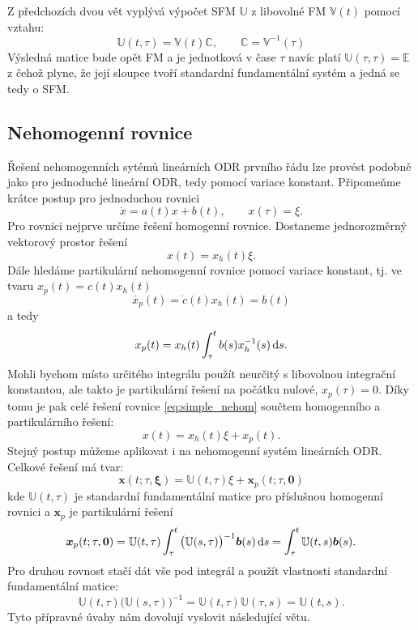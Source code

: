 \documentclass[a4paper, 12pt]{book}
\theoremstyle{definition}
\def\d{\,{\rm d}}               %
\def\vc#1{\mathbf{\boldsymbol{#1}}}     %
\def\tn#1{{\mathbb{#1}}}    %
\begin{document}
Z předchozích dvou vět vyplývá výpočet SFM  $\tn U$ z libovolné FM $\tn V(t)$ pomocí vztahu:
\[
    \tn U(t, \tau) = \tn V(t) \tn C,\qquad \tn C = \tn V^{-1}(\tau)
\]
Výsledná matice bude opět FM a je jednotková v čase $\tau$ navíc platí $\tn U(\tau,\tau) = \tn E$ z čehož plyne, 
že její sloupce tvoří standardní fundamentální systém a jedná se tedy o SFM.


\subsection{Nehomogenní rovnice}
Řešení nehomogenních sytémů lineárních ODR prvního řádu lze provést podobně jako pro jednoduché 
lineární ODR, tedy pomocí variace konstant. Připomeňme krátce postup pro jednoduchou rovnici
\[
  \dot{x} = a(t)x + b(t), \qquad x(\tau) = \xi.
\]
Pro rovnici nejprve určíme řešení homogenní rovnice. Dostaneme jednorozměrný vektorový prostor řešení
\[
   x(t) = x_h(t) \xi. 
\]
Dále hledáme partikulární nehomogenní rovnice pomocí variace konstant, tj. ve tvaru $x_p(t) = c(t) x_h(t)$
\[
   \dot{ x_p }(t) = \dot{c}(t) x_h(t) = b(t)
\]
a tedy
\[
   x_p(t) = x_h(t) \int_\tau^t b(s) x_h^{-1} (s) \d s.
\]   
Mohli bychom místo určitého integrálu použít neurčitý s libovolnou integrační konstantou, 
ale takto je partikulární řešení na počátku nulové, $x_p(\tau) = 0$. Díky tomu je pak celé řešení rovnice \eqref{eq:simple_nehom}
součtem homogenního a partikulárního řešení:
\[
   x(t) = x_h(t) \xi + x_p(t).
\]
Stejný postup můžeme aplikovat i na nehomogenní systém lineárních ODR. Celkové řešení má tvar:
\[
   \vc x(t; \tau, \vc \xi) = \tn U(t, \tau) \xi + \vc x_p(t; \tau, \vc 0)
\]
kde $\tn U(t,\tau)$ je standardní fundamentální matice pro příslušnou homogenní rovnici a  $\vc x_p$ je partikulární řešení 
\[
   \vc x_p(t; \tau, \vc 0) = \tn U(t, \tau) \int_\tau^t \big( \tn U(s,\tau)\big)^{-1} \vc b(s) \d s = 
   \int_\tau^t \tn U(t, s) \vc b(s).
\]
Pro druhou rovnost stačí dát vše pod integrál a použít vlastnosti standardní fundamentální matice:
\[
   \tn U(t, \tau) \big(\tn U(s,\tau) \big)^{-1} = \tn U(t,\tau) \tn U(\tau,s) = \tn U(t,s).
\]
Tyto přípravné úvahy nám dovolují vyslovit následující větu.
\end{document}
